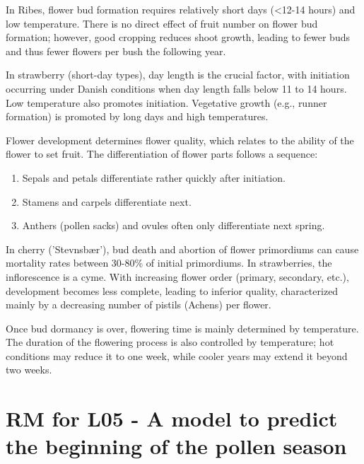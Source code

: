 \vspace{0.5em}
In Ribes, flower bud formation requires relatively short days (<12-14 hours) and low temperature. There is no direct effect of fruit number on flower bud formation; however, good cropping reduces shoot growth, leading to fewer buds and thus fewer flowers per bush the following year.

\vspace{0.5em}
In strawberry (short-day types), day length is the crucial factor, with initiation occurring under Danish conditions when day length falls below 11 to 14 hours. Low temperature also promotes initiation. Vegetative growth (e.g., runner formation) is promoted by long days and high temperatures.

\vspace{0.5em}
Flower development determines flower quality, which relates to the ability of the flower to set fruit. The differentiation of flower parts follows a sequence: 

\begin{enumerate} 
    \item Sepals and petals differentiate rather quickly after initiation. 
    \item Stamens and carpels differentiate next. 
    \item Anthers (pollen sacks) and ovules often only differentiate next spring. 
\end{enumerate} 

\vspace{0.5em}
In cherry ('Stevnsbær'), bud death and abortion of flower primordiums can cause mortality rates between 30-80\% of initial primordiums. In strawberries, the inflorescence is a cyme. With increasing flower order (primary, secondary, etc.), development becomes less complete, leading to inferior quality, characterized mainly by a decreasing number of pistils (Achens) per flower.

\vspace{0.5em}
Once bud dormancy is over, flowering time is mainly determined by temperature. The duration of the flowering process is also controlled by temperature; hot conditions may reduce it to one week, while cooler years may extend it beyond two weeks.


\section{RM for L05 - A model to predict the beginning of the pollen season}

